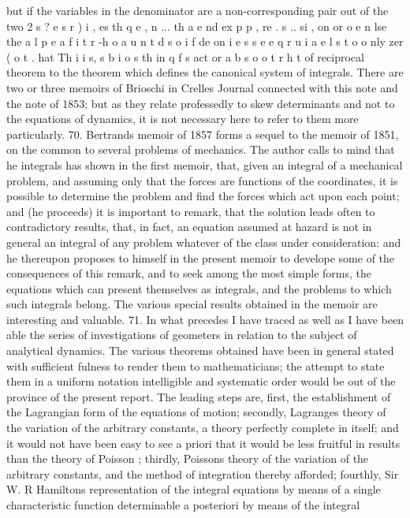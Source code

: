 \documentclass[12pt,a4paper]{article}
\theoremstyle{definition}
\begin{document}
but if the variables in the denominator are a non-corresponding pair out of the two
2 s ? e s r ) i , es th q e , n ... th a e nd ex p p , re . s .. si , on or o e n lse the a l p e a f i t r -h o a u n t d s o i f de on i e s s e e q r u i a e l s t o o nly zer ( o t . hat Th i i s, s b i o s th in q f s act or a b s o o t r h t
of reciprocal theorem to the theorem which defines the canonical system of integrals.
There are two or three memoirs of Brioschi in Crelles Journal connected with this
note and the note of 1853; but as they relate professedly to skew determinants and
not to the equations of dynamics, it is not necessary here to refer to them more
particularly.
70. Bertrands memoir of 1857 forms a sequel to the memoir of 1851, on the
common to several problems of mechanics. The author calls to mind that he
integrals
has shown in the first memoir, that, given an integral of a mechanical problem, and
assuming only that the forces are functions of the coordinates, it is possible to determine
the problem and find the forces which act upon each point; and (he proceeds) it is
important to remark, that the solution leads often to contradictory results, that, in
fact, an equation assumed at hazard is not in general an integral of any problem
whatever of the class under consideration: and he thereupon proposes to himself in
the present memoir to develope some of the consequences of this remark, and to
seek among the most simple forms, the equations which can present themselves as
integrals, and the problems to which such integrals belong. The various special results
obtained in the memoir are interesting and valuable.
71. In what precedes I have traced as well as I have been able the series of
investigations of geometers in relation to the subject of analytical dynamics. The
various theorems obtained have been in general stated with sufficient fulness to render
them to mathematicians; the attempt to state them in a uniform notation
intelligible
and systematic order would be out of the province of the present report. The leading
steps are, first, the establishment of the Lagrangian form of the equations of motion;
secondly, Lagranges theory of the variation of the arbitrary constants, a theory perfectly
complete in itself; and it would not have been easy to see a priori that it would be
less fruitful in results than the theory of Poisson ; thirdly, Poissons theory of the
variation of the arbitrary constants, and the method of integration thereby afforded;
fourthly, Sir W. R Hamiltons representation of the integral equations by means of
a single characteristic function determinable a posteriori by means of the integral
\end{document}

